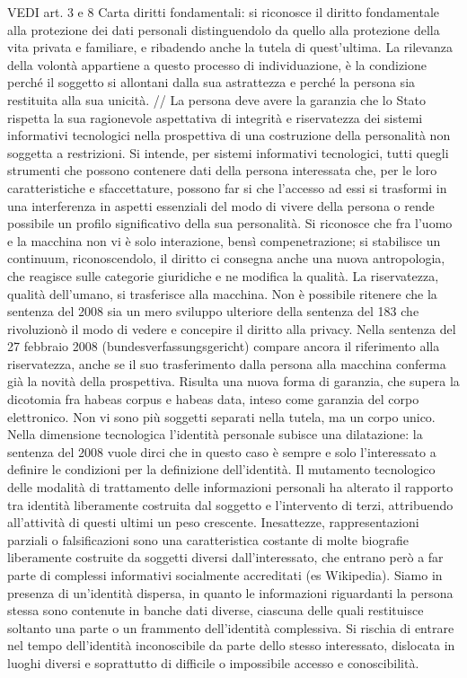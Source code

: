 VEDI art. 3 e 8 Carta diritti fondamentali:
si riconosce il diritto fondamentale alla protezione dei dati personali distinguendolo da quello alla protezione della vita privata e familiare, e ribadendo anche la tutela di quest’ultima. La rilevanza della volontà appartiene a questo processo di individuazione, è la condizione perché il soggetto si allontani dalla sua astrattezza e perché la persona sia restituita alla sua unicità.
//
La persona deve avere la garanzia che lo Stato rispetta la sua ragionevole aspettativa di integrità e riservatezza dei sistemi informativi tecnologici nella prospettiva di una costruzione della personalità non soggetta a restrizioni. Si intende, per sistemi informativi tecnologici, tutti quegli strumenti che possono contenere dati della persona interessata che, per le loro caratteristiche e sfaccettature, possono far si che l’accesso ad essi si trasformi in una interferenza in aspetti essenziali del modo di vivere della persona o rende possibile un profilo significativo della sua personalità.
Si riconosce che fra l’uomo e la macchina non vi è solo interazione, bensì compenetrazione; si stabilisce un continuum, riconoscendolo, il diritto ci consegna anche una nuova antropologia, che reagisce sulle categorie giuridiche e ne modifica la qualità. La riservatezza, qualità dell’umano, si trasferisce alla macchina. Non è possibile ritenere che la sentenza del 2008 sia un mero sviluppo ulteriore della sentenza del 183 che rivoluzionò il modo di vedere e concepire il diritto alla privacy. Nella sentenza del 27 febbraio 2008 (bundesverfassungsgericht) compare ancora il riferimento alla riservatezza, anche se il suo trasferimento dalla persona alla macchina conferma già la novità della prospettiva. Risulta una nuova forma di garanzia, che supera la dicotomia fra habeas corpus e habeas data, inteso come garanzia del corpo elettronico. Non vi sono più soggetti separati nella tutela, ma un corpo unico.
Nella dimensione tecnologica l’identità personale subisce una dilatazione: la sentenza del 2008 vuole dirci che in questo caso è sempre e solo l’interessato a definire le condizioni per la definizione dell’identità. Il mutamento tecnologico delle modalità di trattamento delle informazioni personali ha alterato il rapporto tra identità liberamente costruita dal soggetto e l’intervento di terzi, attribuendo all’attività di questi ultimi un peso crescente. Inesattezze, rappresentazioni parziali o falsificazioni sono una caratteristica costante di molte biografie liberamente costruite da soggetti diversi dall’interessato, che entrano però a far parte di complessi informativi socialmente accreditati (es Wikipedia). Siamo in presenza di un’identità dispersa, in quanto le informazioni riguardanti la persona stessa sono contenute in banche dati diverse, ciascuna delle quali restituisce soltanto una parte o un frammento dell’identità complessiva. Si rischia di entrare nel tempo dell’identità inconoscibile da parte dello stesso interessato, dislocata in luoghi diversi e soprattutto di difficile o impossibile accesso e conoscibilità.
